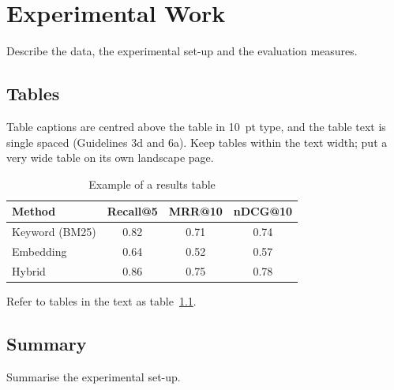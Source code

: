 \chapter{Experimental Work}
\label{ch:experiments}

Describe the data, the experimental set-up and the evaluation measures.

\section{Tables}
Table captions are centred above the table in 10~pt type, and the table text is single
spaced (Guidelines 3d and 6a). Keep tables within the text width; put a very wide table on
its own landscape page.

\begin{table}[htbp]
  \centering
  \caption{Example of a results table}
  \label{tab:example}
  \begin{tabular}{@{}lccc@{}}
    \toprule
    Method        & Recall@5 & MRR@10 & nDCG@10 \\
    \midrule
    Keyword (BM25) & 0.82    & 0.71   & 0.74 \\
    Embedding      & 0.64    & 0.52   & 0.57 \\
    Hybrid         & 0.86    & 0.75   & 0.78 \\
    \bottomrule
  \end{tabular}
\end{table}

Refer to tables in the text as table~\ref{tab:example}.

\section{Summary}
Summarise the experimental set-up.
